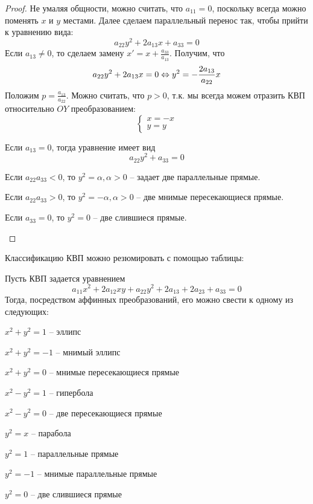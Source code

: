 \begin{proof}
	Не умаляя общности, можно считать, что $a_{11} = 0$, поскольку всегда можно поменять $x$ и $y$ местами.
	Далее сделаем параллельный перенос так, чтобы прийти к уравнению вида:
	\[a_{22} y^2 + 2a_{13} x + a_{33} = 0\]
	Если $a_{13} \neq 0$, то сделаем замену $x' = x + \frac{a_{33}}{a_{13}}$. Получим, что
	\[a_{22} y^2 + 2a_{13} x = 0 \Leftrightarrow y^2 = - \frac{2a_{13}}{a_{22}}x\]
	Положим $p = \frac{a_{13}}{a_{22}}$. Можно считать, что $p > 0$, т.к. мы всегда можем отразить КВП относительно $OY$ преобразованием:
	\[\begin{cases}
		x = -x \\
		y = y
	\end{cases}\]

	Если $a_{13} = 0$, тогда уравнение имеет вид
	\[a_{22} y^2 + a_{33} = 0\]
	\begin{MyList}
		\item Если $a_{22} a_{33} < 0$, то $y^2 = \alpha, \alpha > 0$ -- задает две параллельные прямые.
		\item Если $a_{22} a_{33} > 0$, то $y^2 = -\alpha, \alpha > 0$ -- две мнимые пересекающиеся прямые.
		\item Если $a_{33} = 0$, то $y^2 = 0$ -- две слившиеся прямые. 
	\end{MyList} 
\end{proof}

\begin{Rem}
	Классификацию КВП можно резюмировать с помощью таблицы:
	\begin{figure}[H]
		\centering
		\fontsize{6pt}{2pt}
		\def\svgwidth{.9\columnwidth}
		
	\end{figure}
\end{Rem}

\begin{Thm}
	Пусть КВП задается уравнением
	\[a_{11} x^2 + 2a_{12} xy + a_{22} y^2 + 2a_{13} + 2a_{23} + a_{33} = 0\]
	Тогда, посредством аффинных преобразований, его можно свести к одному из следующих:
	\begin{MyList}
		\item $x^2 + y^2 = 1$ -- эллипс
		\item $x^2 + y^2 = -1$ -- мнимый эллипс
		\item $x^2 + y^2 = 0$ -- мнимые пересекающиеся прямые
		\item $x^2 - y^2 = 1$ -- гипербола
		\item $x^2 - y^2 = 0$ -- две пересекающиеся прямые
		\item $y^2 = x$ -- парабола
		\item $y^2 = 1$ -- параллельные прямые
		\item $y^2 = -1$ -- мнимые параллельные прямые
		\item $y^2 = 0$ -- две слившиеся прямые
	\end{MyList}
\end{Thm}


